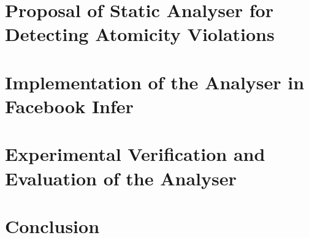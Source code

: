 \chapter{Proposal of Static Analyser for Detecting Atomicity Violations}
\label{chap:proposal}



\chapter{Implementation of the Analyser in Facebook Infer}
\label{chap:implementation}



\chapter{Experimental Verification and Evaluation of the Analyser}
\label{chap:experiments}



\chapter{Conclusion}
\label{chap:conclusion}


